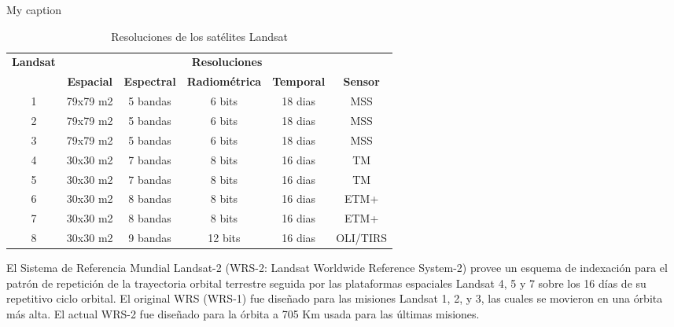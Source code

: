 \begin{table}[htbp]
	\centering
	\caption{My caption}
	\label{my-label}
	\begin{tabular}{|c|c|c|c|c|c|}
		\hline
		\multirow{2}{*}{\textbf{Landsat}} & \multicolumn{5}{c|}{\textbf{Resoluciones}}                                                             \\ \cline{2-6} 
		& \textbf{Espacial} & \textbf{Espectral} & \textbf{Radiom\'etrica} & \textbf{Temporal} & \textbf{Sensor} \\ \hline
		1                                 & 79x79 m2          & 5 bandas           & 6 bits                  & 18 dias           & MSS             \\ \hline
		2                                 & 79x79 m2          & 5 bandas           & 6 bits                  & 18 dias           & MSS             \\ \hline
		3                                 & 79x79 m2          & 5 bandas           & 6 bits                  & 18 dias           & MSS             \\ \hline
		4                                 & 30x30 m2          & 7 bandas           & 8 bits                  & 16 dias           & TM              \\ \hline
		5                                 & 30x30 m2          & 7 bandas           & 8 bits                  & 16 dias           & TM              \\ \hline
		6                                 & 30x30 m2          & 8 bandas           & 8 bits                  & 16 dias           & ETM+            \\ \hline
		7                                 & 30x30 m2          & 8 bandas           & 8 bits                  & 16 dias           & ETM+            \\ \hline
		8                                 & 30x30 m2          & 9 bandas           & 12 bits                 & 16 dias           & OLI/TIRS        \\ \hline
	\end{tabular}
	\caption{Resoluciones de los sat\'elites Landsat}
\end{table}
El Sistema de Referencia Mundial Landsat-2 (WRS-2: Landsat Worldwide Reference System-2) provee un esquema de indexaci\'on para el patr\'on de repetici\'on de la trayectoria orbital terrestre seguida por las plataformas espaciales Landsat 4, 5 y 7 sobre los 16 d\'ias de su repetitivo ciclo orbital. El original WRS (WRS-1) fue dise\~{n}ado para las misiones Landsat 1, 2, y 3, las cuales se movieron en una \'orbita m\'as alta. El actual WRS-2 fue dise\~{n}ado para la \'orbita a 705 Km usada para las \'ultimas misiones.


